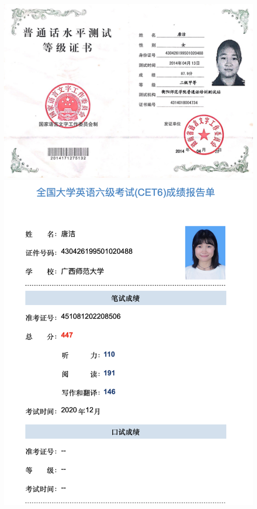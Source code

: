 \documentclass[UFT8]{ctexart}%
\begin{document}
\begin{center}
\includegraphics[scale=0.23]{figs/普通话证.JPG }
\includegraphics[scale=0.24]{figs/英语六级.JPG }
\end{center}
\end{document}
